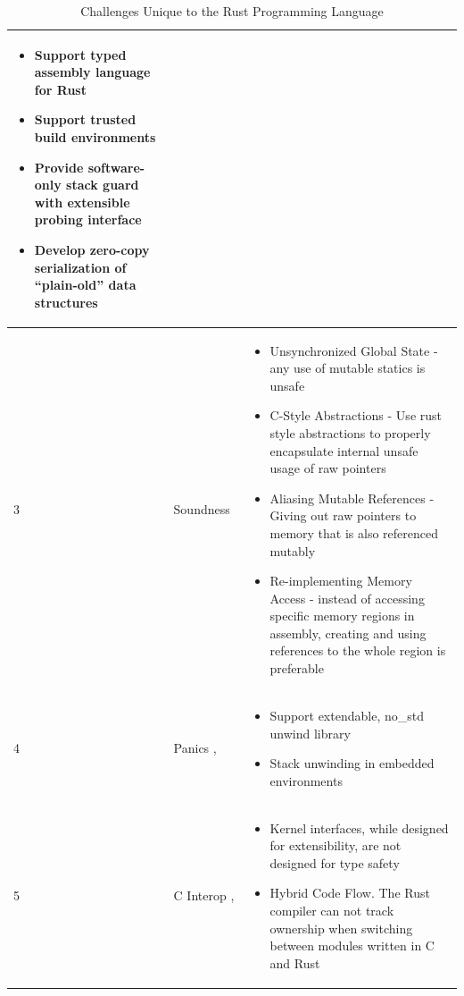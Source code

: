 \documentclass[sigconf]{acmart}
\begin{document}
\begin{table}
\begin{tabular}{p{1cm} p{5cm} p{10cm}}
\begin{itemize}
            \item Support typed assembly language for Rust
            \item Support trusted build environments
            \item Provide software-only stack guard with extensible probing interface
            \item Develop zero-copy serialization of “plain-old” data structures
        \end{itemize}
        \\
        \hline
        3 & Soundness~\cite{Klimt2023-ob} &
        \begin{itemize}
            \item Unsynchronized Global State - any use of mutable statics is unsafe
            \item C-Style Abstractions - Use rust style abstractions to properly encapsulate internal unsafe usage of raw pointers
            \item Aliasing Mutable References - Giving out raw pointers to memory that is also referenced mutably
            \item Re-implementing Memory Access - instead of accessing specific memory regions in assembly, creating and using references to the whole region is preferable
        \end{itemize}
        \\
        \hline
        4 & Panics \cite{Ma2023-ef},\cite{Burtsev2021-mh} &
        \begin{itemize}
            \item Support extendable, no\_std unwind library
            \item Stack unwinding in embedded environments
        \end{itemize}
        \\
        \hline
        5 & C Interop \cite{Miller2019-xm}, \cite{Li2021-xo} &
        \begin{itemize}
            \item Kernel interfaces, while designed for extensibility, are not designed for type safety
            \item Hybrid Code Flow. The Rust compiler can not track ownership when switching between modules written in C and Rust
        \end{itemize}
        \\
    \hline
  \end{tabular}
  \caption{Challenges Unique to the Rust Programming Language}
    \label{tab:RQ3}
\end{table}
\end{document}
